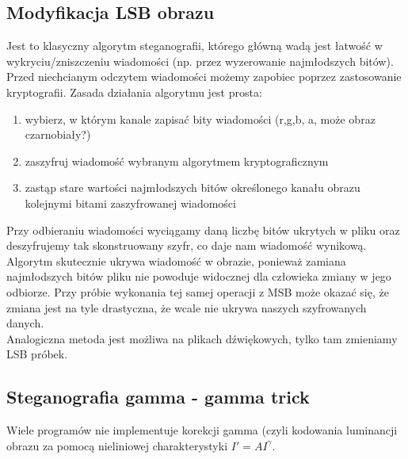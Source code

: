 \documentclass{article}
\begin{document}
\subsection{Modyfikacja LSB obrazu}
Jest to klasyczny algorytm steganografii, którego główną wadą jest łatwość w wykryciu/zniszczeniu wiadomości
(np. przez wyzerowanie najmłodszych bitów). Przed niechcianym odczytem wiadomości możemy zapobiec 
poprzez zastosowanie kryptografii. Zasada działania algorytmu jest prosta:
\begin{enumerate}
	\item wybierz, w którym kanale zapisać bity wiadomości (r,g,b, a, może obraz czarnobiały?)
        \item zaszyfruj wiadomość wybranym algorytmem kryptograficznym
	\item zastąp stare wartości najmłodszych bitów określonego kanału obrazu kolejnymi bitami zaszyfrowanej wiadomości
\end{enumerate}
Przy odbieraniu wiadomości wyciągamy daną liczbę bitów ukrytych w pliku oraz deszyfrujemy tak skonstruowany szyfr, co daje nam wiadomość wynikową.
\\
Algorytm skutecznie ukrywa wiadomość w obrazie, ponieważ zamiana najmłodszych bitów pliku nie powoduje widocznej dla człowieka zmiany w jego odbiorze. Przy próbie wykonania
tej samej operacji z MSB może okazać się, że zmiana jest na tyle drastyczna, że wcale nie ukrywa naszych szyfrowanych danych.
\\
Analogiczna metoda jest możliwa na plikach dźwiękowych, tylko tam zmieniamy LSB próbek.
\subsection{Steganografia gamma - gamma trick}
Wiele programów nie implementuje korekcji gamma (czyli kodowania luminancji obrazu za pomocą nieliniowej charakterystyki $I' = AI^{\gamma}$.
\end{document}
